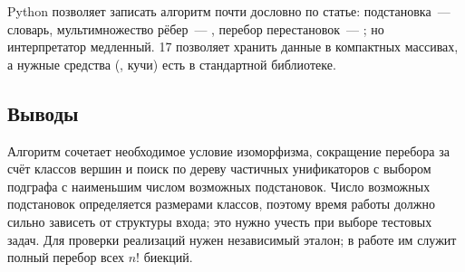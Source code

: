 Python позволяет записать алгоритм почти дословно по статье: подстановка~--- словарь, мультимножество рёбер~--- , перебор перестановок~--- ; но интерпретатор медленный.
\Cpp{}17 позволяет хранить данные в компактных массивах, а нужные средства (, кучи) есть в стандартной библиотеке.

\subsection{Выводы}

Алгоритм \ISOMn{} сочетает необходимое условие изоморфизма, сокращение перебора за счёт классов вершин и поиск по дереву частичных унификаторов с выбором подграфа с наименьшим числом возможных подстановок.
Число возможных подстановок определяется размерами классов, поэтому время работы должно сильно зависеть от структуры входа; это нужно учесть при выборе тестовых задач.
Для проверки реализаций нужен независимый эталон; в работе им служит полный перебор всех $n!$ биекций.
